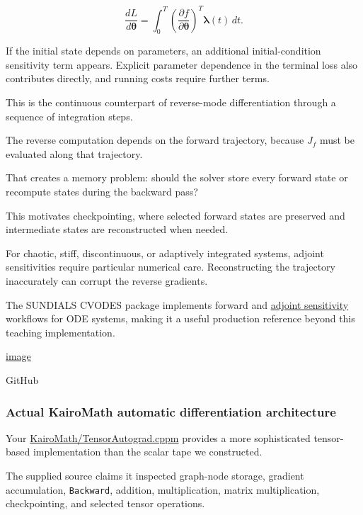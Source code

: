 \[
\boxed{ \frac{dL}{d\boldsymbol\theta} = \int_0^T \left(\frac{\partial f}{\partial\boldsymbol\theta}\right)^T \boldsymbol\lambda(t)\,dt }.
\]

If the initial state depends on parameters, an additional initial-condition sensitivity term appears. Explicit parameter dependence in the terminal loss also contributes directly, and running costs require further terms.

This is the continuous counterpart of reverse-mode differentiation through a sequence of integration steps.

The reverse computation depends on the forward trajectory, because \(J_f\) must be evaluated along that trajectory.

That creates a memory problem: should the solver store every forward state or recompute states during the backward pass?

This motivates checkpointing, where selected forward states are preserved and intermediate states are reconstructed when needed.

For chaotic, stiff, discontinuous, or adaptively integrated systems, adjoint sensitivities require particular numerical care. Reconstructing the trajectory inaccurately can corrupt the reverse gradients.

The SUNDIALS CVODES package implements forward and \hyperref[02-foundations-ii-ch022]{adjoint sensitivity} workflows for ODE systems, making it a useful production reference beyond this teaching implementation. 

\href{https://www.google.com/s2/favicons?domain=https://github.com&sz=32}{image}

GitHub

\subsubsection{Actual KairoMath automatic differentiation architecture}\label{actual-kairomath-automatic-differentiation-architecture}

Your \href{https://github.com/swayam8624/KairoMath/blob/master/TensorAutograd.cppm?utm_source=chatgpt.com}{KairoMath/TensorAutograd.cppm} provides a more sophisticated tensor-based implementation than the scalar tape we constructed.

The supplied source claims it inspected graph-node storage, gradient accumulation, \texttt{Backward}, addition, multiplication, matrix multiplication, checkpointing, and selected tensor operations.

